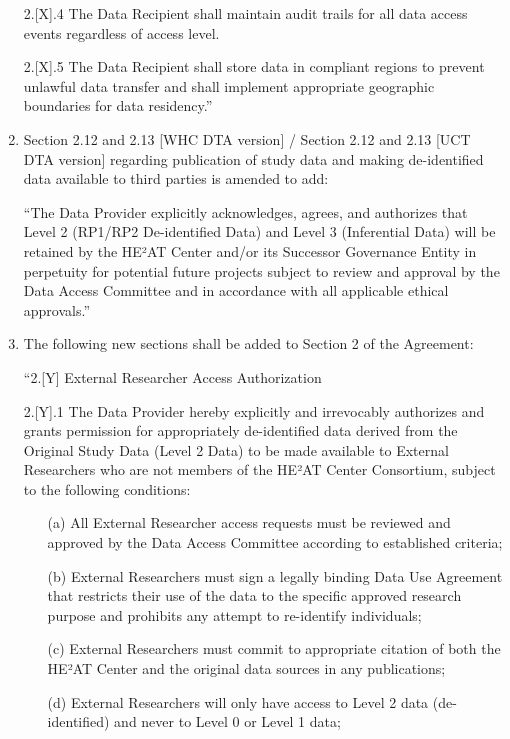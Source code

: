 \documentclass[12pt,letterpaper]{article}
\begin{document}
\begin{enumerate}
2.[X].4 The Data Recipient shall maintain audit trails for all data access events regardless of access level.

2.[X].5 The Data Recipient shall store data in compliant regions to prevent unlawful data transfer and shall implement appropriate geographic boundaries for data residency.''

\item Section 2.12 and 2.13 [WHC DTA version] / Section 2.12 and 2.13 [UCT DTA version] regarding publication of study data and making de-identified data available to third parties is amended to add:

``The Data Provider explicitly acknowledges, agrees, and authorizes that Level 2 (RP1/RP2 De-identified Data) and Level 3 (Inferential Data) will be retained by the HE²AT Center and/or its Successor Governance Entity in perpetuity for potential future projects subject to review and approval by the Data Access Committee and in accordance with all applicable ethical approvals.''

\item The following new sections shall be added to Section 2 of the Agreement:

``2.[Y] External Researcher Access Authorization

2.[Y].1 The Data Provider hereby explicitly and irrevocably authorizes and grants permission for appropriately de-identified data derived from the Original Study Data (Level 2 Data) to be made available to External Researchers who are not members of the HE²AT Center Consortium, subject to the following conditions:

\begin{enumerate}
\item[(a)] All External Researcher access requests must be reviewed and approved by the Data Access Committee according to established criteria;
   
\item[(b)] External Researchers must sign a legally binding Data Use Agreement that restricts their use of the data to the specific approved research purpose and prohibits any attempt to re-identify individuals;
   
\item[(c)] External Researchers must commit to appropriate citation of both the HE²AT Center and the original data sources in any publications;
   
\item[(d)] External Researchers will only have access to Level 2 data (de-identified) and never to Level 0 or Level 1 data;
   

\end{enumerate}
\end{enumerate}
\end{document}
